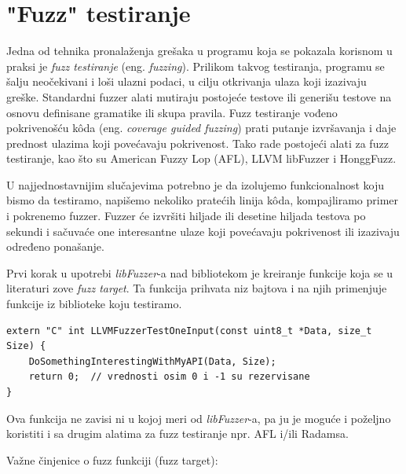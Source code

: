 \section{"Fuzz" testiranje}\label{fuzz-testiranje}

Jedna od tehnika pronalaženja grešaka u programu koja se pokazala korisnom u praksi je \emph{fuzz testiranje} (eng. \emph{fuzzing}). Prilikom takvog testiranja, programu se šalju neočekivani i loši ulazni podaci, u cilju otkrivanja ulaza koji izazivaju greške. Standardni fuzzer alati mutiraju postojeće testove ili generišu testove na osnovu definisane gramatike ili skupa pravila. Fuzz testiranje vođeno pokrivenošću kôda (eng. \emph{coverage guided fuzzing}) prati putanje izvršavanja i daje prednost ulazima koji povećavaju pokrivenost. Tako rade postojeći alati za fuzz testiranje, kao što su American Fuzzy Lop (AFL), LLVM libFuzzer i HonggFuzz.

U najjednostavnijim slučajevima potrebno je da izolujemo funkcionalnost koju bismo da testiramo, napišemo nekoliko pratećih linija kôda, kompajliramo primer i pokrenemo fuzzer. Fuzzer će izvršiti hiljade ili desetine hiljada testova po sekundi i sačuvaće one interesantne ulaze koji povećavaju pokrivenost ili izazivaju određeno ponašanje.

Prvi korak u upotrebi \emph{libFuzzer}-a nad bibliotekom je kreiranje funkcije koja se u literaturi zove \emph{fuzz target}. Ta funkcija prihvata niz bajtova i na njih primenjuje funkcije iz biblioteke koju testiramo.

\begin{verbatim}
extern "C" int LLVMFuzzerTestOneInput(const uint8_t *Data, size_t Size) {
    DoSomethingInterestingWithMyAPI(Data, Size);
    return 0;  // vrednosti osim 0 i -1 su rezervisane
}
\end{verbatim}

Ova funkcija ne zavisi ni u kojoj meri od \emph{libFuzzer}-a, pa ju je moguće i poželjno koristiti i sa drugim alatima za fuzz testiranje npr. AFL i/ili Radamsa.

Važne činjenice o fuzz funkciji (fuzz target):

